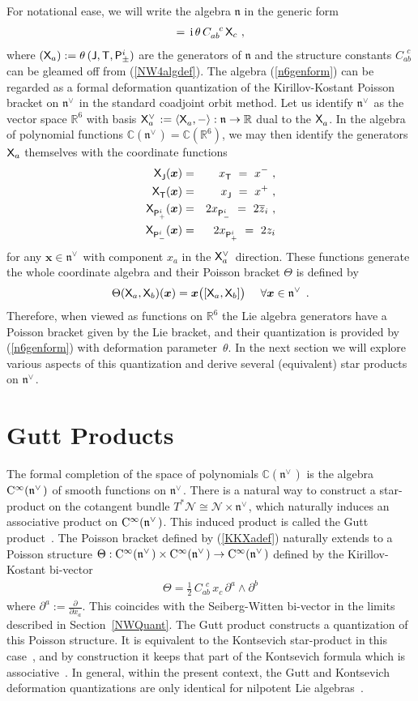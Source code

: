 \documentclass[11pt,a4paper]{article}
\def\nn{\nonumber}
\newcommand{\1}{\mathbb{1}}
\newcommand{\mbf}[1]{{\boldsymbol {#1} }}
\def\ii{{\,{\rm i}\,}}
\def\CC{{\rm C}}
\def\P{{\sf P}}
\def\T{{\sf T}}
\def\X{{\sf X}}
\def\J{{\sf J}}
\def\mx{{\mbf x}}
\def\mfn{{\mathfrak n}}
\newcommand{\newsection}{\setcounter{equation}{0}\section}
\newcommand{\complex}{{\mathbb C}} %
\newcommand{\real}{{\mathbb R}} %
\def\nn{\nonumber}
\def\bea{\begin{eqnarray}}
\def\eea{\end{eqnarray}}
\newcommand{\beq}{\begin{eqnarray}}
\newcommand{\eeq}{\end{eqnarray}}
\begin{document}
For notational ease, we will write the algebra $\mathfrak{n}$ in the
generic form
\beq
[\X_a,\X_b]=\ii\theta\,C_{ab}^{~~c}\,\X_c \ ,
\label{n6genform}\eeq
where $(\X_a):=\theta\,(\J,\T,\P^i_\pm)$ are the
generators of $\mathfrak{n}$ and the structure constants
$C_{ab}^{~~c}$ can be gleamed off from (\ref{NW4algdef}). The algebra
(\ref{n6genform}) can be regarded
as a formal deformation quantization of the Kirillov-Kostant Poisson bracket on
$\mathfrak{n}^{\vee\,}$ in the standard coadjoint orbit method. Let us
identify $\mathfrak{n}^{\vee\,}$ as the vector space $\real^6$ with basis
$\X_a^{\vee\,}:=\langle\X^{~}_a,-\rangle:\mfn\to\real$ dual to the
$\X_a^{~}$. In the algebra of polynomial functions
$\complex(\mathfrak{n}^{\vee\,})=\complex(\real^6)$, we may then identify
the generators $\X_a$ themselves with the coordinate functions
\bea
\X^{~}_\J(\mx)&=&x^{~}_\T~=~x^- \ , \nn\\ \X^{~}_\T(\mx)
&=&x^{~}_\J~=~x^+ \ , \nn\\
\X^{~}_{\P_+^i}(\mx)&=&2x^{~}_{\P_-^i}~=~2\overline{z}_i \ ,
\nn\\ \X^{~}_{\P_-^i}(\mx)&=&2x^{~}_{\P_+^i}~=~2z_i
\label{Xacoordfns}\eea
for any $\mx\in\mathfrak{n}^{\vee\,}$ with component $x_a$ in the
$\X_a^{\vee\,}$
direction. These functions generate the whole coordinate algebra and
their Poisson bracket $\Theta$ is defined by
\beq
\Theta(\X_a,\X_b)(\mx)=\mx\bigl([\X_a,\X_b]\bigr) ~~~~ \forall\mx\in
\mathfrak{n}^{\vee\,} \ .
\label{KKXadef}\eeq
Therefore, when viewed as functions on $\real^6$ the Lie algebra
generators have a Poisson bracket given by the Lie bracket, and their
quantization is provided by (\ref{n6genform}) with deformation
parameter~$\theta$. In the next section
we will explore various aspects of this quantization and derive
several (equivalent) star products on $\mfn^{\vee\,}$.

\newsection{Gutt Products\label{StarProds}}

The formal completion of the space of polynomials
$\complex(\mfn^{\vee\,})$ is the algebra ${\rm
  C}^\infty(\mathfrak{n}^{\vee\,})$ of smooth functions on
$\mathfrak{n}^{\vee\,}$. There is a natural way to construct a
star-product on the cotangent bundle
$T^*\mathcal{N}\cong\mathcal{N}\times\mathfrak{n}^{\vee\,}$, which
naturally induces an associative product on ${\rm
  C}^\infty(\mfn^{\vee\,})$. This induced product is called the Gutt
product~\cite{Gutt1}. The Poisson bracket defined by (\ref{KKXadef})
naturally extends to a Poisson structure
$\Theta:\CC^\infty(\mfn^{\vee\,})\times\CC^\infty(\mfn^{\vee\,})
\to\CC^\infty(\mfn^{\vee\,})$ defined by the Kirillov-Kostant
bi-vector
\beq
\Theta=\mbox{$\frac12$}\,C_{ab}^{~~c}\,x_c\,\partial^a\wedge\partial^b
\label{KKbivector}\eeq
where $\partial^a:=\frac{\partial}{\partial x_a}$. This coincides with
the Seiberg-Witten bi-vector in the limits described in
Section~\ref{NWQuant}. The Gutt product constructs a
  quantization of this Poisson structure. It is equivalent to the
  Kontsevich star-product in this case~\cite{Dito1}, and by
  construction it keeps that part of the Kontsevich formula which is
  associative~\cite{Shoikhet1}. In general, within the present
  context, the Gutt and Kontsevich deformation quantizations are only
  identical for nilpotent Lie algebras~\cite{Kathotia1}.
\end{document}
